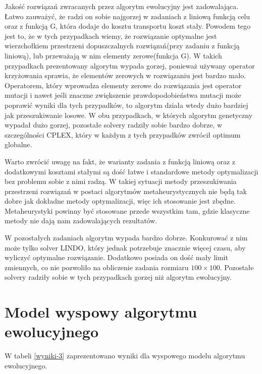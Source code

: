 Jakość rozwiązań zwracanych przez algorytm ewolucyjny jest zadowalająca. Łatwo zauważyć, że radzi on sobie najgorzej w zadaniach z liniową funkcją celu 
oraz z funkcją G, która dodaje do kosztu transportu koszt stały. Powodem tego jest to, że w tych przypadkach wiemy, że rozwiązanie optymalne jest 
wierzchołkiem przestrzeni dopuszczalnych rozwiązań(przy zadaniu z funkcją liniową\cite{ALG-GEN-BOOK}), lub przeważają w nim elementy zerowe(funkcja G). 
W takich przypadkach prezentowany algorytm wypada gorzej, ponieważ używany operator krzyżowania sprawia, że elementów zerowych w rozwiązaniu 
jest bardzo mało. Operatorem, który wprowadza elementy zerowe do rozwiązania jest operator mutacji i nawet jeśli znaczne zwiększenie prawdopodobieństwa 
mutacji może poprawić wyniki dla tych przypadków, to algorytm działa wtedy dużo bardziej jak przeszukiwanie losowe. W obu przypadkach, w których 
algorytm genetyczny wypadał dużo gorzej, pozostałe solvery radziły sobie bardzo dobrze, w szczególności CPLEX, który w każdym z tych przypadków zwrócił 
optimum globalne. 

Warto zwrócić uwagę na fakt, że warianty zadania z funkcją liniową oraz z dodatkowymi kosztami stałymi są dość łatwe i 
standardowe metody optymalizacji bez problemu sobie z nimi radzą. W takiej sytuacji metody przeszukiwania przestrzeni rozwiązań w postaci algorytmów 
metaheurystycznych nie będą tak dobre jak dokładne metody optymalizacji, więc ich stosowanie jest zbędne. Metaheurystyki powinny być stosowane 
przede wszystkim tam, gdzie klasyczne metody nie dają nam zadowalających rezultatów.

W pozostałych zadaniach algorytm wypada bardzo dobrze. Konkurować z nim może tylko solver LINDO, który jednak potrzebuje znacznie więcej czasu, 
aby wyliczyć optymalne rozwiązanie. Dodatkowo posiada on dość mały limit zmiennych, co nie pozwoliło na obliczenie zadania rozmiaru $100 \times 100$. 
Pozostałe solvery radziły sobie w tych przypadkach gorzej niż algorytm ewolucyjny.

\newpage

\section{Model wyspowy algorytmu ewolucyjnego}

W tabeli \ref{wyniki-3} zaprezentowano wyniki dla wyspowego modelu algorytmu ewolucyjnego.


